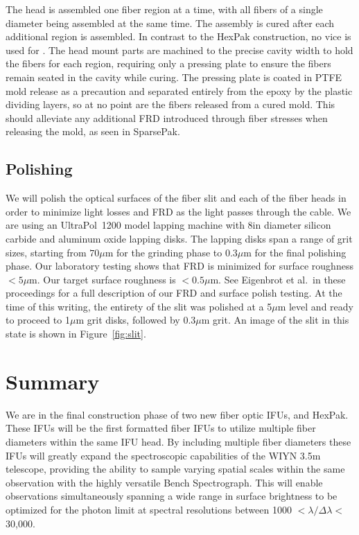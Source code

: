 The \GP head is assembled one fiber region at a time, with all fibers of a
single diameter being assembled at the same time.  The assembly is cured after
each additional region is assembled.  In contrast to the HexPak construction,
no vice is used for \GP.  The head mount parts are machined to the precise
cavity width to hold the fibers for each region, requiring only a pressing
plate to ensure the fibers remain seated in the cavity while curing.  The
pressing plate is coated in PTFE mold release as a precaution and separated
entirely from the epoxy by the plastic dividing layers, so at no point are the
fibers released from a cured mold.  This should alleviate any additional FRD
introduced through fiber stresses when releasing the mold, as seen in
SparsePak.


\subsection{Polishing}
\label{subsec:polishing}
We will polish the optical surfaces of the fiber slit and each of the fiber
heads in order to minimize light losses and FRD as the light passes through
the cable.  We are using an UltraPol\footnotemark[2]\ 1200 model lapping
machine with 8in diameter silicon carbide and aluminum oxide lapping disks.
 The lapping disks span a range of grit
sizes, starting from $70\mu$m for the grinding phase to $0.3\mu$m for the
final polishing phase.  Our laboratory testing shows that FRD is minimized for
surface roughness $<5\mu$m.  Our target surface roughness is $<0.5\mu$m.
See Eigenbrot et al.\ in these proceedings for a full description of our FRD
and surface polish testing.  At the time of this writing, the entirety of the
slit was polished at a 5$\mu$m level and ready to proceed to 1$\mu$m grit
disks, followed by 0.3$\mu$m grit.  An image of the slit in this state is
shown in Figure~\ref{fig:slit}.


\section{Summary} 
\label{GPB:sec:conclusion}

We are in the final construction phase of two new fiber optic IFUs, \GP
and HexPak.  These IFUs will be the first formatted fiber IFUs to utilize
multiple fiber diameters within the same IFU head.  By including multiple
fiber diameters these IFUs will greatly expand the spectroscopic capabilities
of the WIYN 3.5m telescope, providing the ability to sample varying spatial
scales within the same observation with the highly versatile Bench
Spectrograph.  This will enable observations simultaneously spanning a wide
range in surface brightness to be optimized for the photon limit at spectral
resolutions between 1000 $< \lambda/\Delta\lambda <$ 30,000.


